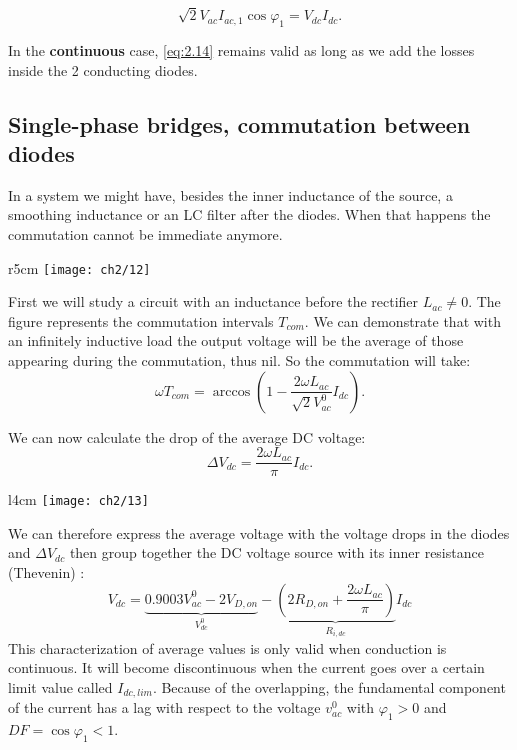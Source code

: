 		\begin{equation}
			\sqrt{2}V_{ac}I_{ac,1} \cos \varphi _1= V_{dc}I_{dc}. 
		\end{equation}
		
		In the \textbf{continuous} case, \eqref{eq:2.14} remains valid as long as we add the losses inside the 2 conducting diodes. 
		
	\subsection{Single-phase bridges, commutation between diodes}
	    
	    In a system we might have, besides the inner inductance of the source, a smoothing inductance or an LC filter after the diodes. When that happens the commutation cannot be immediate anymore. \\
		
	\begin{wrapfigure}[8]{r}{5cm}
		\vspace{-5mm}
		\texttt{[image: ch2/12]}
		\end{wrapfigure} 
		First we will study a circuit with an inductance before the rectifier $L_{ac} \neq 0$. The figure represents the commutation intervals $T_{com}$. We can demonstrate that with an infinitely inductive load the output voltage will be the average of those appearing during the commutation, thus nil. So the commutation will take: 
		\begin{equation}
			\omega T_{com} = \arccos \left( 1-\frac{2\omega L_{ac}}{\sqrt{2}V_{ac}^0} I_{dc}\right). 
		\end{equation}
		
		We can now calculate the drop of the average DC voltage: 
		\begin{equation}
			\Delta V_{dc} = \frac{2\omega L_{ac}}{\pi}I_{dc}. 
		\end{equation}
		
		\begin{wrapfigure}[5]{l}{4cm}
		\vspace{-5mm}
		\texttt{[image: ch2/13]}
		\end{wrapfigure} 
		We can therefore express the average voltage with the voltage drops in the diodes and $\Delta V_{dc}$ then group together the DC voltage source with its inner resistance (Thevenin) : 
		\begin{equation}
			V_{dc} = \underbrace{0.9003 V_{ac}^0 - 2V_{D,on}}_{V_{dc}^0} - \underbrace{\left( 2 R_{D,on} + \frac{2\omega L_{ac}}{\pi} \right)}_{R_{i,dc}} I_{dc}
		\end{equation}
		This characterization of average values is only valid when conduction is continuous. It will become discontinuous when the current goes over a certain limit value called $I_{dc,lim}$. Because of the overlapping, the fundamental component of the current has a lag with respect to the voltage $v_{ac}^0$ with $\varphi _1 >0$ and $DF = \cos \varphi _1 < 1$. \\
		
